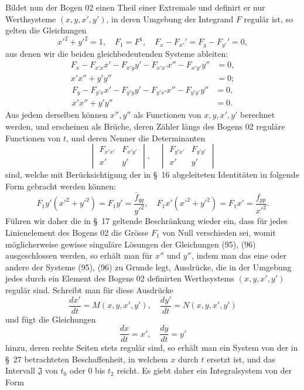 \documentclass[11pt,a4paper,leqno]{article}
\begin{document}
Bildet nun der Bogen 02 einen Theil einer Extremale und definirt er nur Werthsysteme $(x,y,x',y')$, in deren Umgebung der Integrand $F$ regulär ist, so gelten die Gleichungen
\[
x'^2+y'^2=1,
\quad
F_1=F^1,
\quad
F_x-F_{x'}'=F_y-F_{y'}'=0,
\]
aus denen wir die beiden gleichbedeutenden Systeme ableiten:
\begin{equation}\tag{95}
\begin{aligned}
F_x-F_{x'x}x'-F_{x'y}y'-F_{x'x'}x''-F_{x'y'}y''&=0,\\
x'x''+y'y''&=0;
\end{aligned}
\end{equation}
\begin{equation}\tag{96}
\begin{aligned}
F_y-F_{y'x}x'-F_{y'y}y'-F_{y'x'}x''-F_{y'y'}y''&=0,\\
x'x''+y'y''&=0.
\end{aligned}
\end{equation}
Aus jedem derselben können $x'',y''$ als Functionen von $x,y,x',y'$ berechnet werden, und erscheinen als Brüche, deren Zähler längs des Bogens 02 reguläre Functionen von $t$, und deren Nenner die Determinanten
\[
\begin{vmatrix}
F_{x'x'}&F_{x'y'}\\
x'&y'
\end{vmatrix},
\quad
\begin{vmatrix}
F_{y'x'}&F_{y'y'}\\
x'&y'
\end{vmatrix}
\]
sind, welche mit Berücksichtigung der in \S~16 abgeleiteten Identitäten in folgende Form gebracht werden können:
\[
F_1y'(x'^2+y'^2)=F_1y'=\frac{\bar f_{qq}}{y'^2},
\quad
F_1x'(x'^2+y'^2)=F_1x'=\frac{f_{pp}}{x'^2}.
\]
Führen wir daher die in \S~17 geltende Beschränkung wieder ein, dass für jedes Linienelement des Bogens 02 die Grösse $F_1$ von Null verschieden sei, womit möglicherweise gewisse singuläre Lösungen der Gleichungen (95), (96) ausgeschlossen werden, so erhält man für $x''$ und $y''$, indem man das eine oder andere der Systeme (95), (96) zu Grunde legt, Ausdrücke, die in der Umgebung jedes durch ein Element des Bogens 02 definirten Werthsystems $(x,y,x',y')$ regulär sind. Schreibt man für diese Ausdrücke
\[
\frac{dx'}{dt}=M(x,y,x',y'),
\quad
\frac{dy'}{dt}=N(x,y,x',y')
\]
und fügt die Gleichungen
\[
\frac{dx}{dt}=x',
\quad
\frac{dy}{dt}=y'
\]
hinzu, deren rechte Seiten stets regulär sind, so erhält man ein System von der in \S~27 betrachteten Beschaffenheit, in welchem $x$ durch $t$ ersetzt ist, und das Intervall $\mathfrak J$ von $t_0$ oder 0 bis $t_2$ reicht. Es giebt daher ein Integralsystem von der Form
\end{document}
